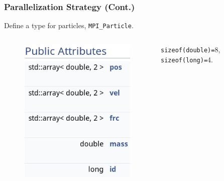 \begin{frame}[fragile]
\frametitle{Parallelization Strategy (Cont.)}
Define a type for particles, \lstinline|MPI_Particle|.
	\begin{columns}
		\begin{column}{0.4\textwidth}
			\begin{figure}
				\centering
				\includegraphics[width=\textwidth]{inclfigs/particle.png}
			\end{figure}
		\end{column}
		\begin{column}{0.6\textwidth}
			\lstinline|sizeof(double)=|\SI{8}{\byte}, \lstinline|sizeof(long)=|\SI{4}{\byte}.
	\end{column}
	\end{columns}
\end{frame}
